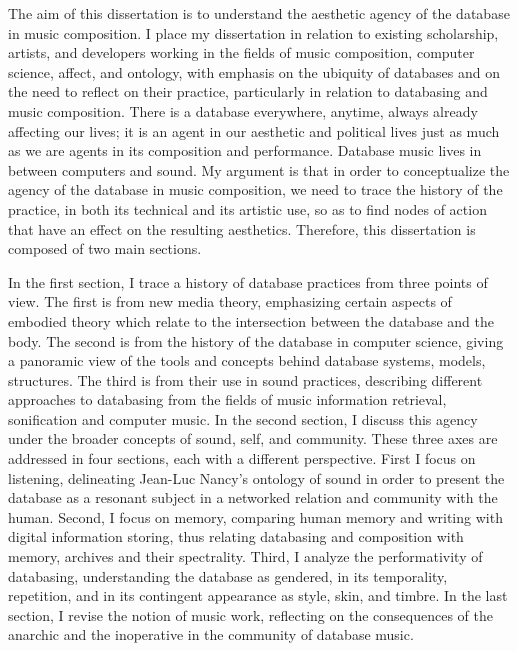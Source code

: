 The aim of this dissertation is to understand the aesthetic agency of the database in music composition. I place my dissertation in relation to existing scholarship, artists, and developers working in the fields of music composition, computer science, affect, and ontology, with emphasis on the ubiquity of databases and on the need to reflect on their practice, particularly in relation to databasing and music composition. There is a database everywhere, anytime, always already affecting our lives; it is an agent in our aesthetic and political lives just as much as we are agents in its composition and performance. Database music lives in between computers and sound. My argument is that in order to conceptualize the agency of the database in music composition, we need to trace the history of the practice, in both its technical and its artistic use, so as to find nodes of action that have an effect on the resulting aesthetics. Therefore, this dissertation is composed of two main sections.

In the first section, I trace a history of database practices from three points of view. The first is from new media theory, emphasizing certain aspects of embodied theory which relate to the intersection between the database and the body. The second is from the history of the database in computer science, giving a panoramic view of the tools and concepts behind database systems, models, structures. The third is from their use in sound practices, describing different approaches to databasing from the fields of music information retrieval, sonification and computer music. In the second section, I discuss this agency under the broader concepts of sound, self, and community. These three axes are addressed in four sections, each with a different perspective. First I focus on listening, delineating Jean-Luc Nancy's ontology of sound in order to present the database as a resonant subject in a networked relation and community with the human. Second, I focus on memory, comparing human memory and writing with digital information storing, thus relating databasing and composition with memory, archives and their spectrality. Third, I analyze the performativity of databasing, understanding the database as gendered, in its temporality, repetition, and in its contingent appearance as style, skin, and timbre. In the last section, I revise the notion of music work, reflecting on the consequences of the anarchic and the inoperative in the community of database music.

